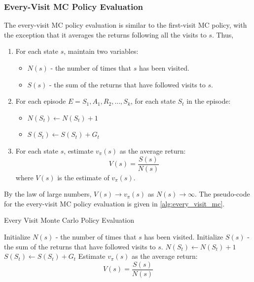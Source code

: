 \subsubsection{Every-Visit MC Policy Evaluation}
The every-visit MC policy evaluation is similar to the first-visit MC policy, with
the exception that it averages the returns following all the visits to \(s\). Thus,
\begin{enumerate}
    \item For each state \(s\), maintain two variables:
    \begin{itemize}
        \item \(N(s)\) - the number of times that \(s\) has been visited.
        \item \(S(s)\) - the sum of the returns that have followed visits to \(s\).
    \end{itemize}
    \item For each episode \(E = S_1, A_1, R_2, \dots, S_k\), for each state \(S_t\) 
    in the episode:
    \begin{itemize}
        \item \(N(S_t) \leftarrow N(S_t) + 1\)
        \item \(S(S_t) \leftarrow S(S_t) + G_t\)
    \end{itemize}
    \item For each state \(s\), estimate \(v_{\pi}(s)\) as the average return:
    \[
        V(s) = \frac{S(s)}{N(s)}
    \]
    where \(V(s)\) is the estimate of \(v_{\pi}(s)\).
\end{enumerate}
By the law of large numbers, \(V(s) \to v_{\pi}(s)\) as \(N(s) \to \infty\). The pseudo-code
for the every-visit MC policy evaluation is given in \autoref{alg:every_visit_mc}.
\begin{algorithm}[H]
    \caption{Every Visit Monte Carlo Policy Evaluation}
    \label{alg:every_visit_mc}
    \begin{algorithmic}[1]
            \State Initialize $N(s)$ - the number of times that $s$ has been visited.
            \State Initialize $S(s)$ - the sum of the returns that have followed visits to $s$.
        \EndFor
                \State $N(S_t) \leftarrow N(S_t) + 1$
                \State $S(S_t) \leftarrow S(S_t) + G_t$
            \EndFor
        \EndFor
            \State Estimate $v_{\pi}(s)$ as the average return:
            \[
                V(s) = \frac{S(s)}{N(s)}
            \]
        \EndFor
    \end{algorithmic}
\end{algorithm}

